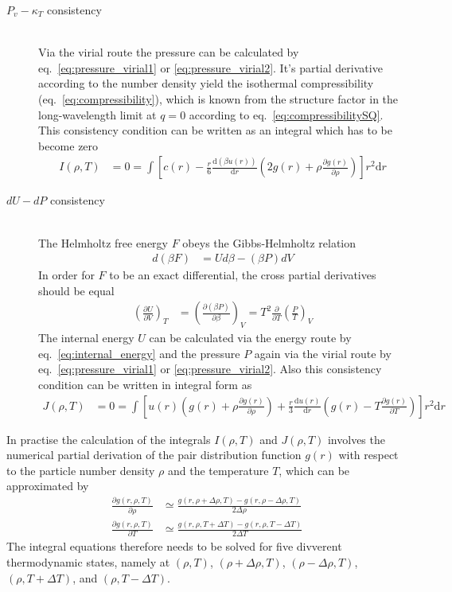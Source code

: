 \begin{description}
\item[$P_v-\kappa_T$ consistency] \vphantom{.}~\\
Via the virial route the pressure can be calculated by eq.\
\ref{eq:pressure_virial1} or \ref{eq:pressure_virial2}. It's partial
derivative according to the number density yield the isothermal
compressibility (eq.\ \ref{eq:compressibility}), which is known from the structure factor
in the long-wavelength limit at $q=0$ according to eq.\  \ref{eq:compressibilitySQ}.
This consistency condition can be written as an integral which has to be become zero \cite{Martynov1993,Vompe1994}
\begin{align}
I(\rho,T)&=0=\int\left[c(r)-\frac{r}{6}\frac{\mathrm{d}\left(\beta u(r)\right)}{\mathrm{d}r}\left(2g(r)+\rho\frac{\partial g(r)}{\partial\rho}\right)\right] r^2 \mathrm{d}r
\end{align}
\item[$dU-dP$ consistency]  \vphantom{.}~\\
The Helmholtz free energy $F$ obeys the Gibbs-Helmholtz relation
\begin{align}
d(\beta F) &= U d\beta - (\beta P) dV
\end{align}
In order for $F$ to be an exact differential, the cross partial
derivatives should be equal
\begin{align}
\left(\frac{\partial U}{\partial V}\right)_T &= \left( \frac{\partial (\beta P)}{\partial \beta} \right)_V = T^2 \frac{\partial}{\partial T} \left( \frac{P}{T} \right)_V
\end{align}
The internal energy $U$ can be calculated via the energy route by eq.\
\ref{eq:internal_energy} and the pressure $P$ again via the virial route by
eq.\ \ref{eq:pressure_virial1} or \ref{eq:pressure_virial2}.
Also this consistency condition can be written in integral form as
\begin{align}
J(\rho,T)&=0=\int\left[u(r)\left(g(r)+\rho\frac{\partial g(r)}{\partial \rho}\right)+\frac{r}{3}\frac{\mathrm{d} u(r)}{\mathrm{d}r}\left(g(r)-T\frac{\partial g(r)}{\partial T}\right)\right] r^2 \mathrm{d}r
\end{align}
\end{description}
In practise  the calculation of the integrals $I(\rho,T)$ and $J(\rho,T)$ involves the numerical partial derivation of the
pair distribution function $g(r)$ with respect to the particle number density $\rho$ and the temperature $T$, which can
be approximated by
\begin{align}
\frac{\partial g(r,\rho,T)}{\partial \rho} &\simeq \frac{g(r,\rho+\Delta\rho,T)-g(r,\rho-\Delta\rho,T)}{2\Delta\rho} \\
\frac{\partial g(r,\rho,T)}{\partial T}    &\simeq \frac{g(r,\rho,T+\Delta T)-g(r,\rho,T-\Delta T)}{2\Delta T}
\end{align}
The integral equations therefore needs to be solved for five divverent thermodynamic states, namely at $(\rho,T)$,
$(\rho+\Delta\rho,T)$, $(\rho-\Delta\rho,T)$, $(\rho,T+\Delta T)$, and $(\rho,T-\Delta T)$.

